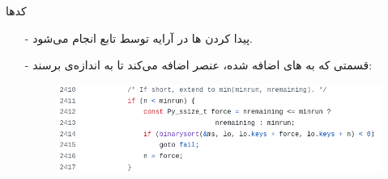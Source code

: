 \begin{frame}{کدها}
\begin{itemize}\itemr
\item[-]
پیدا کردن ها در آرایه توسط تابع 
انجام می‌شود.
\item[-]
قسمتی که به های اضافه شده، عنصر اضافه می‌کند تا به اندازه‌ی 
برسند:

\begin{figure}[H]
\begin{center}
\includegraphics[width=\textwidth, height=0.5\textheight]{docs/images/force}
\end{center}
\end{figure}
\end{itemize}
\end{frame}